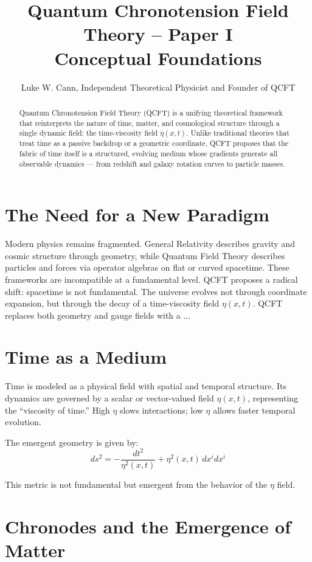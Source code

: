\documentclass[12pt]{article}
\title{Quantum Chronotension Field Theory – Paper I\\\large Conceptual Foundations}
\author{Luke W. Cann, Independent Theoretical Physicist and Founder of QCFT}
\date{}
\begin{document}
\maketitle
\begin{abstract}
Quantum Chronotension Field Theory (QCFT) is a unifying theoretical framework that reinterprets the nature of time, matter, and cosmological structure through a single dynamic field: the time-viscosity field $\eta(x,t)$. Unlike traditional theories that treat time as a passive backdrop or a geometric coordinate, QCFT proposes that the fabric of time itself is a structured, evolving medium whose gradients generate all observable dynamics --- from redshift and galaxy rotation curves to particle masses.
\end{abstract}

\section{The Need for a New Paradigm}

Modern physics remains fragmented. General Relativity describes gravity and cosmic structure through geometry, while Quantum Field Theory describes particles and forces via operator algebras on flat or curved spacetime. These frameworks are incompatible at a fundamental level. QCFT proposes a radical shift: spacetime is not fundamental. The universe evolves not through coordinate expansion, but through the decay of a time-viscosity field $\eta(x,t)$. QCFT replaces both geometry and gauge fields with a ...

\section{Time as a Medium}

Time is modeled as a physical field with spatial and temporal structure. Its dynamics are governed by a scalar or vector-valued field $\eta(x,t)$, representing the ``viscosity of time.'' High $\eta$ slows interactions; low $\eta$ allows faster temporal evolution.

The emergent geometry is given by:
\[
ds^2 = -\frac{dt^2}{\eta^2(x,t)} + \eta^2(x,t) \, dx^i dx^i
\]

This metric is not fundamental but emergent from the behavior of the $\eta$ field.

\section{Chronodes and the Emergence of Matter}
\end{document}
